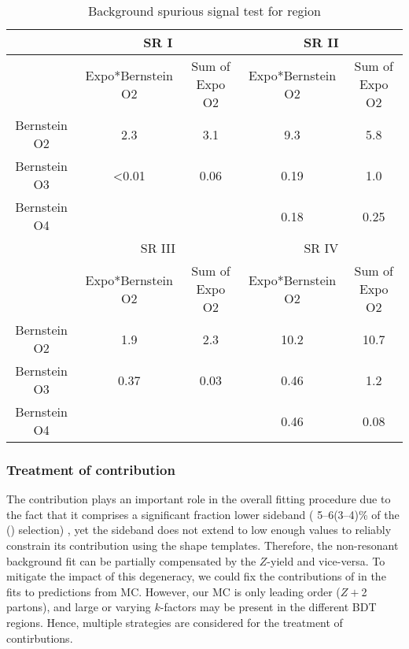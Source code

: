 \begin{table}[]
\centering
\caption{Background spurious signal test for \fourcentral region}
\label{tab:spurious-test-4cen}
\begin{tabular}{|c|c|c|c|c|}
\hline
             & \multicolumn{2}{c|}{SR I}                  & \multicolumn{2}{c|}{SR II}                 \\ \hline
             & Expo*Bernstein O2 & Sum of Expo O2 & Expo*Bernstein O2 & Sum of Expo O2 \\ \hline
Bernstein O2 & 2.3               & 3.1                    & 9.3               & 5.8                    \\ \hline
Bernstein O3 & \textless0.01     & 0.06                   & 0.19              & 1.0                    \\ \hline
Bernstein O4 &                   &                        & 0.18              & 0.25                   \\ \hline
             & \multicolumn{2}{c|}{SR III}                & \multicolumn{2}{c|}{SR IV}                 \\ \hline
             & Expo*Bernstein O2 & Sum of Expo O2 & Expo*Bernstein O2 & Sum of Expo O2 \\ \hline
Bernstein O2 & 1.9               & 2.3                    & 10.2              & 10.7                   \\ \hline
Bernstein O3 & 0.37              & 0.03                   & 0.46              & 1.2                    \\ \hline
Bernstein O4 &                   &                        & 0.46              & 0.08                   \\ \hline
\end{tabular}
\end{table}


\clearpage

\subsubsection{Treatment of \zjets{} contribution}
\label{sec:ztreat}

The \zjets{} contribution plays an important role in the overall fitting procedure due to the fact that it comprises a significant fraction lower \Mbb{} sideband ( 5--6(3--4)\% of the \fourcentral(\twocentral) selection) , yet the sideband does not extend to low enough \Mbb{} values to reliably constrain its contribution using the shape templates.  Therefore, the non-resonant background fit can be partially compensated by the $Z$-yield and vice-versa.  To mitigate the impact of this degeneracy, we could fix the contributions of \zjets{} in the fits to predictions from MC.  However, our \zjets{} MC is only leading order ($Z+$2 partons), and large or varying $k$-factors may be present in the different BDT regions. Hence, multiple strategies are considered for the treatment of \zjets{} contirbutions. 

